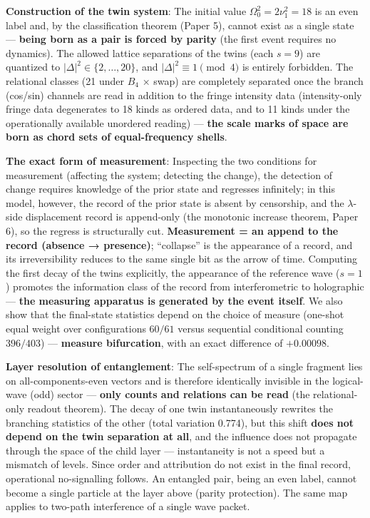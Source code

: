 \documentclass[
]{ltjsarticle}
\begin{document}
\textbf{Construction of the twin system}: The initial value
\(\Omega_0^2=2\nu_1^2=18\) is an even label and, by the classification
theorem (Paper 5), cannot exist as a single state --- \textbf{being born
as a pair is forced by parity} (the first event requires no dynamics).
The allowed lattice separations of the twins (each \(s=9\)) are
quantized to \(|\Delta|^2\in\{2,\ldots,20\}\), and
\(|\Delta|^2\equiv1\pmod4\) is entirely forbidden. The relational
classes (21 under \(B_4\) × swap) are completely separated once the
branch (cos/sin) channels are read in addition to the fringe intensity
data (intensity-only fringe data degenerates to 18 kinds as ordered
data, and to 11 kinds under the operationally available unordered
reading) --- \textbf{the scale marks of space are born as chord sets of
equal-frequency shells}.

\textbf{The exact form of measurement}: Inspecting the two conditions
for measurement (affecting the system; detecting the change), the
detection of change requires knowledge of the prior state and regresses
infinitely; in this model, however, the record of the prior state is
absent by censorship, and the \(\lambda\)-side displacement record is
append-only (the monotonic increase theorem, Paper 6), so the regress is
structurally cut. \textbf{Measurement = an append to the record (absence
→ presence)}; ``collapse'' is the appearance of a record, and its
irreversibility reduces to the same single bit as the arrow of time.
Computing the first decay of the twins explicitly, the appearance of the
reference wave (\(s=1\)) promotes the information class of the record
from interferometric to holographic --- \textbf{the measuring apparatus
is generated by the event itself}. We also show that the final-state
statistics depend on the choice of measure (one-shot equal weight over
configurations \(60/61\) versus sequential conditional counting
\(396/403\)) --- \textbf{measure bifurcation}, with an exact difference
of \(+0.00098\).

\textbf{Layer resolution of entanglement}: The self-spectrum of a single
fragment lies on all-components-even vectors and is therefore
identically invisible in the logical-wave (odd) sector --- \textbf{only
counts and relations can be read} (the relational-only readout theorem).
The decay of one twin instantaneously rewrites the branching statistics
of the other (total variation 0.774), but this shift \textbf{does not
depend on the twin separation at all}, and the influence does not
propagate through the space of the child layer --- instantaneity is not
a speed but a mismatch of levels. Since order and attribution do not
exist in the final record, operational no-signalling follows. An
entangled pair, being an even label, cannot become a single particle at
the layer above (parity protection). The same map applies to two-path
interference of a single wave packet.
\end{document}
